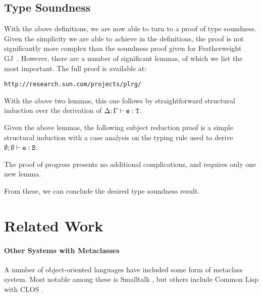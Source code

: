 \documentclass[nocopyrightspace,10pt]{acm-sigplan}
\begin{document}
\figComp



\subsection{Type Soundness}
\label{proof}

With the above definitions, we are now able to turn to a proof of type
soundness. Given the simplicity we are able to achieve in the
definitions, the proof is not significantly more complex than the
soundness proof given for Featherweight GJ\ \cite{FJ}.  However, there
are a number of significant lemmas, of which we list the most
important. The full proof is available at:

\vspace{.1cm}
\verb|http://research.sun.com/projects/plrg/|

\newpage
\fieldsPreservedLemma

\fieldsPreservedProof

\methodTypingLemma
\newpage

\methodTypingProof

\substitutionPreservesTyping
\myProof With the above two lemmas, this one follows by
straightforward structural induction over the derivation of ${\Delta;\Gamma} \vdash {\ensuremath{{\mbox {\tt e}} : {\mathtt{{T}}}}}$.

\vspace{.3cm}

Given the above lemmas, the following subject reduction proof is a
simple structural induction with a case analysis on the typing rule
used to derive ${\emptyset;\emptyset} \vdash {\ensuremath {{\mbox {\tt e}} : {\mbox {\tt S}}}}$.

\preservation

\preservationProof

The proof of progress presents no additional complications, and
requires only one new lemma.

\fieldsAgreeLemma

\progress

\progressProof

From these, we can conclude the desired type soundness result.

\soundness

\soundnessProofShort


\section{Related Work}
\label{related}

\paragraph{Other Systems with Metaclasses}
A number of object-oriented languages have included some form of
metaclass system. Most notable among these is Smalltalk
\cite{Smalltalk80}, but others include Common Lisp with CLOS
\cite{ArtMOP}.
\end{document}
